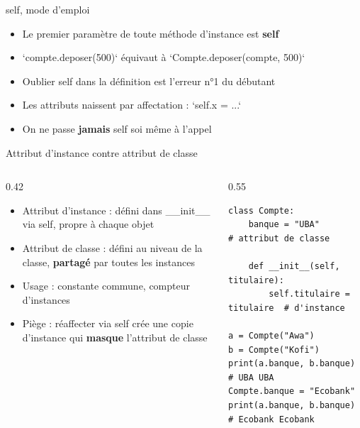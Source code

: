 \documentclass[aspectratio=169,11pt]{beamer}
\begin{document}
\begin{frame}{self, mode d'emploi}
\begin{itemize}
  \item Le premier paramètre de toute méthode d'instance est \textbf{self}
  \item `compte.deposer(500)` équivaut à `Compte.deposer(compte, 500)`
  \item Oublier self dans la définition est l'erreur n°1 du débutant
  \item Les attributs naissent par affectation : `self.x = ...`
  \item On ne passe \textbf{jamais} self soi même à l'appel
\end{itemize}
\end{frame}

\begin{frame}[fragile]{Attribut d'instance contre attribut de classe}
\begin{columns}[t]
\begin{column}{0.42\textwidth}
\begin{itemize}
  \setlength{\itemsep}{1.5pt}\setlength{\parskip}{0pt}
  \item Attribut d'instance : défini dans \_\_init\_\_ via self, propre à chaque objet
  \item Attribut de classe : défini au niveau de la classe, \textbf{partagé} par toutes les instances
  \item Usage : constante commune, compteur d'instances
  \item Piège : réaffecter via self crée une copie d'instance qui \textbf{masque} l'attribut de classe
\end{itemize}
\end{column}
\hspace{0.02\textwidth}
\begin{column}{0.55\textwidth}
\begin{lstlisting}[style=pysmall]
class Compte:
    banque = "UBA"          # attribut de classe

    def __init__(self, titulaire):
        self.titulaire = titulaire  # d'instance

a = Compte("Awa")
b = Compte("Kofi")
print(a.banque, b.banque)      # UBA UBA
Compte.banque = "Ecobank"
print(a.banque, b.banque)      # Ecobank Ecobank
\end{lstlisting}
\end{column}
\end{columns}
\end{frame}
\end{document}
